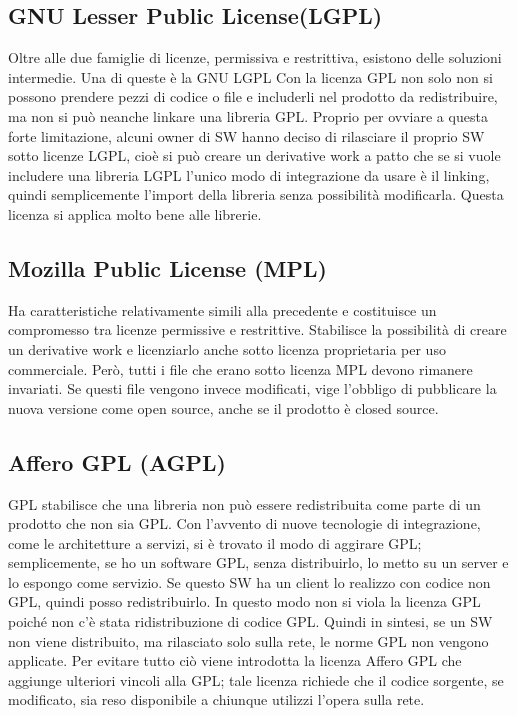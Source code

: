 \documentclass[10pt,a4paper]{book}
\begin{document}
\subsection{GNU Lesser Public License(LGPL)}
Oltre alle due famiglie di licenze, permissiva e restrittiva, esistono delle soluzioni intermedie. Una di queste è la GNU LGPL
Con la licenza GPL non solo non si possono prendere pezzi di codice o file e includerli nel prodotto da redistribuire, ma non si può neanche linkare una libreria GPL. Proprio per ovviare a questa forte limitazione, alcuni owner di SW hanno deciso di rilasciare il proprio SW sotto licenze LGPL, cioè si può creare un derivative work a patto che se si vuole includere una libreria LGPL l'unico modo di integrazione da usare è il linking, quindi semplicemente l'import della libreria senza possibilità modificarla. Questa licenza si applica molto bene alle librerie.

\subsection{Mozilla Public License (MPL)}
Ha caratteristiche relativamente simili alla precedente e costituisce un compromesso tra licenze permissive e restrittive. Stabilisce la possibilità di creare un derivative work e licenziarlo anche sotto licenza proprietaria per uso commerciale.
Però, tutti i file che erano sotto licenza MPL devono rimanere invariati. Se questi file vengono invece modificati, vige l'obbligo di pubblicare la nuova versione come open source, anche se il prodotto è closed source.

\subsection{Affero GPL (AGPL)}
GPL stabilisce che una libreria non può essere redistribuita come parte di un prodotto che non sia GPL. Con l'avvento di nuove tecnologie di integrazione, come le architetture a servizi, si è trovato il modo di aggirare GPL; semplicemente, se ho un software GPL, senza distribuirlo, lo metto su un server e lo espongo come servizio. Se questo SW ha un client lo realizzo con codice non GPL, quindi posso redistribuirlo. In questo modo non si viola la licenza GPL poiché non c'è stata ridistribuzione di codice GPL.
Quindi in sintesi, se un SW non viene distribuito, ma rilasciato solo sulla rete, le norme GPL non vengono applicate.
Per evitare tutto ciò viene introdotta la licenza Affero GPL che aggiunge ulteriori vincoli alla GPL; tale licenza richiede che il codice sorgente, se modificato, sia reso disponibile a chiunque utilizzi l'opera sulla rete.
\end{document}
